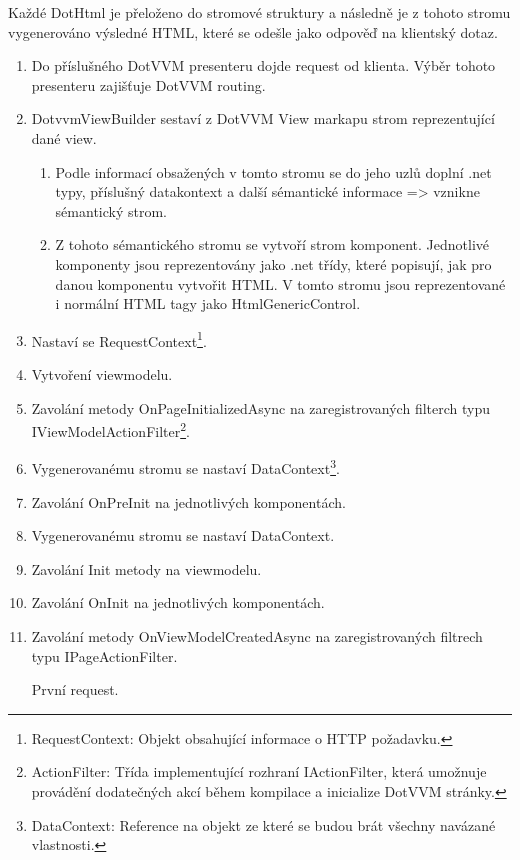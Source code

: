 Každé DotHtml je přeloženo do stromové struktury a následně je z tohoto stromu vygenerováno výsledné HTML, které se odešle jako odpověď na klientský dotaz.

\begin{enumerate}
    \item Do příslušného DotVVM presenteru dojde request od klienta. Výběr tohoto presenteru zajišťuje DotVVM routing.
    \item DotvvmViewBuilder sestaví z DotVVM View markapu strom reprezentující dané view. 
    \begin{enumerate}[label*=\arabic*.]
        \item Podle informací obsažených v tomto stromu se do jeho uzlů doplní .net typy, příslušný datakontext a další sémantické informace => vznikne sémantický strom.
        \item Z tohoto sémantického stromu se vytvoří strom komponent. Jednotlivé komponenty jsou reprezentovány jako .net třídy, které popisují, jak pro danou komponentu vytvořit HTML. V tomto stromu jsou reprezentované i normální HTML tagy jako HtmlGenericControl.
    \end{enumerate}
    \item Nastaví se RequestContext\footnote{RequestContext: Objekt obsahující informace o HTTP požadavku.}.
    \item Vytvoření viewmodelu.
    \item Zavolání metody OnPageInitializedAsync na zaregistrovaných filterch typu IViewModelActionFilter\footnote{\label{ActionFilterNote}ActionFilter: Třída implementující rozhraní IActionFilter, která umožnuje provádění dodatečných akcí během kompilace a inicialize DotVVM stránky. }.
    \item Vygenerovanému stromu se nastaví DataContext\footnote{\label{DataContext}DataContext: Reference na objekt ze které se budou brát všechny navázané vlastnosti.}.
    \item Zavolání OnPreInit na jednotlivých komponentách.
    \item Vygenerovanému stromu se nastaví DataContext.
    \item Zavolání Init metody na viewmodelu.
    \item Zavolání OnInit na jednotlivých komponentách.
    \item Zavolání metody OnViewModelCreatedAsync na zaregistrovaných filtrech typu IPageActionFilter.
    \begin{multicols}{2}
        První request.

\end{multicols}
\end{enumerate}
